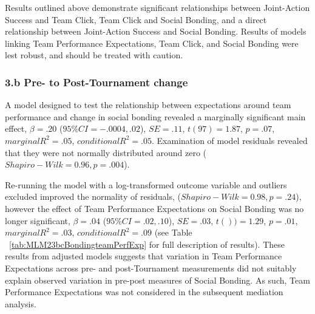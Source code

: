 \begin{landscape}
  Results outlined above demonstrate significant relationships between Joint-Action Success and Team Click, Team Click and Social Bonding, and a direct relationship between Joint-Action Success and Social Bonding. Results of models linking Team Performance Expectations, Team Click, and Social Bonding were lest robust, and should be treated with caution.



  
  \restoregeometry

  \subsubsection{3.b Pre- to Post-Tournament change}

  A model designed to test the relationship between expectations around team performance and change in social bonding revealed a marginally significant main effect, $\beta = .20$ ($95\% CI =  -.0004, .02$), $SE = .11$, $t(97) = 1.87$, $p = .07$, $marginal R^2 = .05$, $conditional R^2 = .05$.  Examination of model residuals revealed that they were not normally distributed around zero ($Shapiro-Wilk = 0.96, p = .004$).

  Re-running the model with a log-transformed outcome variable and outliers excluded improved the normality of residuals, ($Shapiro-Wilk = 0.98, p = .24$), however the effect of Team Performance Expectations on Social Bonding was no longer significant, $\beta = .04$ ($95\% CI =  .02, .10$), $SE = .03$, $t()) = 1.29$, $p = .01$, $marginal R^2 = .03$, $conditional R^2 = .09$ (see Table ~\ref{tab:MLM23bcBondingteamPerfExp} for full description of results).  These results from adjusted models suggests that variation in Team Performance Expectations across pre- and post-Tournament measurements did not suitably explain observed variation in pre-post measures of Social Bonding.  As such, Team Performance Expectations was not considered in the subsequent mediation analysis.




\end{landscape}
